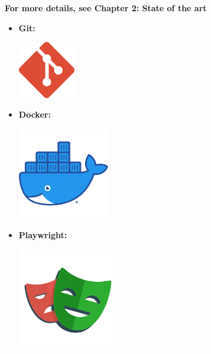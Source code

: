 \medskip
\textbf {For more details, see Chapter 2: State of the art}

\begin{itemize}
    \item \textbf{Git:} \newline
          \begin{minipage}{\linewidth}
              \centering
              \includegraphics[width=2.5cm]{src/assets/logos/git_512x512.png}
          \end{minipage}
    \item \textbf{Docker:} \newline
          \begin{minipage}{\linewidth}
              \centering
              \includegraphics[width=4cm]{src/assets/logos/docker_512x512.png}
          \end{minipage}
    \item \textbf{Playwright:} \newline
          \begin{minipage}{\linewidth}
              \centering
              \includegraphics[width=4.5cm]{src/assets/logos/playwright_512x512.png}
          \end{minipage}


\end{itemize}
